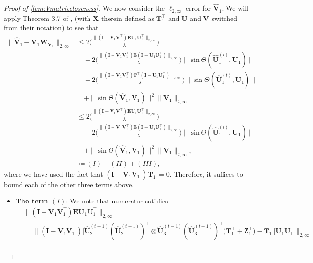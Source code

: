\documentclass[10pt]{article}
\newcommand{\0}{{\mathbf{0}}}
\newcommand{\1}{{\mathbf{1}}}
\newcommand{\U}{{\mathbf{U}}}
\renewcommand{\citet}{\cite}
\renewcommand{\t}{^{\top}}
\newcommand{\uhat}{\mathbf{\hat{U}}}
\renewcommand{\hat}{\widehat}
\renewcommand{\hat}{\widehat}
\begin{document}
\begin{proof}[Proof of \cref{lem:Vmatrixcloseness}]
We now consider the $\ell_{2,\infty}$ error for $\mathbf{\hat V}_1$.  We will apply Theorem 3.7 of \citet{cape_two--infinity_2019}, (with $\mathbf{X}$ therein defined as $\mathbf{T}_1\t$ and $\U$ and $\mathbf{V}$ switched from their notation) to see that %
\begin{align}
    \| \mathbf{\hat V}_1 - \mathbf{V}_1 \mathbf{W}_{\mathbf{V}_1} \|_{2,\infty} &\leq 2 \bigg( \frac{ \| ( \mathbf{I} - \mathbf{V}_1 \mathbf{V}_1\t ) \mathbf{E} \U_1 \U_1\t \|_{2,\infty}}{\lambda} \bigg)  \nonumber\\
    &\quad + 2 \bigg( \frac{ \| ( \mathbf{I} - \mathbf{V}_1 \mathbf{V}_1\t ) \mathbf{E} ( \mathbf{I} - \U_1 \U_1\t) \|_{2,\infty}}{\lambda} \bigg) \| \sin\Theta(\uhat_1^{(t)}, \U_1 ) \|  \nonumber\\
    &\quad + 2 \bigg( \frac{  \| ( \mathbf{I} - \mathbf{V}_1 \mathbf{V}_1\t ) \mathbf{T}_1\t ( \mathbf{I} - \U_1 \U_1\t) \|_{2,\infty}}{\lambda} \bigg) \| \sin\Theta( \uhat_1^{(t)}, \U_1 ) \| \nonumber\\
    &\quad + \| \sin\Theta( \mathbf{\hat V}_1, \mathbf{V}_1 ) \|^2 \| \mathbf{V}_1 \|_{2,\infty} \nonumber\\
    &\leq 2 \bigg( \frac{ \| ( \mathbf{I} - \mathbf{V}_1 \mathbf{V}_1\t ) \mathbf{E} \U_1 \U_1\t \|_{2,\infty}}{\lambda} \bigg)  \nonumber\\
    &\quad + 2 \bigg( \frac{ \| ( \mathbf{I} - \mathbf{V}_1 \mathbf{V}_1\t ) \mathbf{E} ( \mathbf{I} - \U_1 \U_1\t) \|_{2,\infty}}{\lambda} \bigg) \| \sin\Theta(\uhat_1^{(t)}, \U_1 ) \|  \nonumber\\
    &\quad + \| \sin\Theta( \mathbf{\hat V}_1, \mathbf{V}_1 ) \|^2 \| \mathbf{V}_1 \|_{2,\infty}, \\
    &\coloneqq (I) + (II) + (III),
    \label{eq:v1twoinfty}
\end{align}
where we have used the fact that $(\mathbf{I}- \mathbf{V}_1 \mathbf{V}_1\t) \mathbf{T}_1\t = 0$.  Therefore, it suffices to bound each of the other three terms above.  
\begin{itemize}
    \item 
\textbf{The term $(I)$}: We note that numerator satisfies
\begin{align*}
    &\| ( \mathbf{I} - \mathbf{V}_1 \mathbf{V}_1\t ) \mathbf{E} \U_1 \U_1\t \|_{2,\infty} \\
    &= \|  ( \mathbf{I} - \mathbf{V}_1 \mathbf{V}_1\t ) \bigg[ \uhat_2^{(t-1)} (\uhat_2^{(t-1)})\t \otimes \uhat_3^{(t-1)} (\uhat_3^{(t-1)})\t \big(  \mathbf{T}_1\t + \mathbf{Z}_1\t \big) - \mathbf{T}_1\t \bigg] \U_1 \U_1\t \|_{2,\infty} \\

\end{align*}
\end{itemize}
\end{proof}
\end{document}
